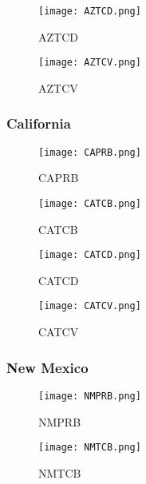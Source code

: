\documentclass{mcmthesis}
\begin{document}
\begin{figure}[H]
\begin{minipage}[htb]{0.5\textwidth}
\centering
\texttt{[image: AZTCD.png]}
\caption{AZTCD} \label{fig:AZTCD}
\end{minipage}
\begin{minipage}[htb]{0.5\textwidth}
\centering
\texttt{[image: AZTCV.png]}
\caption{AZTCV} \label{fig:AZTCV}
\end{minipage}
\end{figure}

\subsubsection{California}
\begin{figure}[H]
\begin{minipage}[htb]{0.5\textwidth}
\centering
\texttt{[image: CAPRB.png]}
\caption{CAPRB} \label{fig:CAPRB}
\end{minipage}
\begin{minipage}[htb]{0.5\textwidth}
\centering
\texttt{[image: CATCB.png]}
\caption{CATCB} \label{fig:CATCB}
\end{minipage}
\end{figure}

\begin{figure}[H]
\begin{minipage}[htb]{0.5\textwidth}
\centering
\texttt{[image: CATCD.png]}
\caption{CATCD} \label{fig:CATCD}
\end{minipage}
\begin{minipage}[htb]{0.5\textwidth}
\centering
\texttt{[image: CATCV.png]}
\caption{CATCV} \label{fig:CATCV}
\end{minipage}
\end{figure}

\subsubsection{New Mexico}
\begin{figure}[H]
\begin{minipage}[htb]{0.5\textwidth}
\centering
\texttt{[image: NMPRB.png]}
\caption{NMPRB} \label{fig:NMPRB}
\end{minipage}
\begin{minipage}[htb]{0.5\textwidth}
\centering
\texttt{[image: NMTCB.png]}
\caption{NMTCB} \label{fig:NMTCB}
\end{minipage}
\end{figure}
\end{document}
